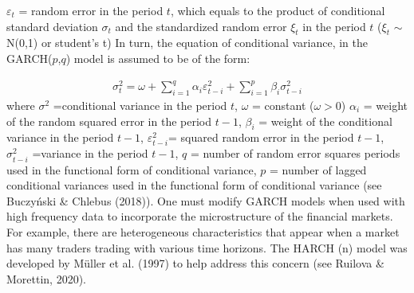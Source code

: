 \documentclass[a4paper,11pt,oneside]{book}
\begin{document}
$\varepsilon_t$ = random error in the period $t$, which equals to the
product of conditional standard deviation $\sigma_t$ and  the
standardized random error $\xi_t$ in the period $t$ ($\xi_t$ $\sim$ N(0,1) or student's t)
\newline\newline
In turn, the equation of conditional variance, in the GARCH($p$,$q$) model is assumed to be of the form:


\begin{equation}
\begin{aligned}
\sigma^2_t = \omega + \sum_{i=1}^{q}\alpha_{i}\varepsilon^{2}_{t-i} + \sum_{i=1}^{p}\beta_{i} \sigma^2_{t-i}
\label{7}
\end{aligned}
\end{equation}
where $\sigma^2$ =conditional variance in the period $t$,\newline
$\omega$ = constant ($\omega>0$)\newline
$\alpha_{i}$ = weight of the random squared error in the period $t-1$,\newline
$\beta_{i}$ = weight of the conditional variance in the period $t-1$,\newline
$\varepsilon^{2}_{t-i}$= squared random error in the period $t-1$,\newline
$\sigma^2_{t-i}$ =variance in the period $t-1$,\newline
$q$ = number of random error squares periods used in the functional form of conditional variance,\newline
$p$ = number of lagged conditional variances used in the
functional form of conditional variance (see Buczyński \& Chlebus (2018)).\newline\newline
 One must modify GARCH models when used with high frequency data to incorporate the microstructure of the financial markets. For example, there are heterogeneous characteristics that appear when a market has many traders trading with various time horizons. The HARCH (n) model was developed by Müller et al. (1997) to help address this concern (see Ruilova \& Morettin, 2020).
\end{document}
